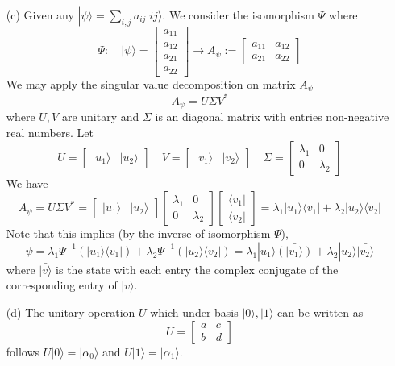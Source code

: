 \begin{enumerate}
\begin{enumerate}
    \item[(c)] Given any $|\psi\rangle = \sum_{i,j} a_{ij} |ij\rangle$. We consider the isomorphism $\Psi$ where
    \[
    \Psi : \quad |\psi\rangle = \begin{bmatrix}
        a_{11} \\ a_{12} \\ a_{21} \\ a_{22}
    \end{bmatrix} \longrightarrow A_{\psi} := \begin{bmatrix}
        a_{11} & a_{12} \\ a_{21} & a_{22}
    \end{bmatrix}
    \]
    We may apply the singular value decomposition on matrix $A_{\psi}$
    \[
    A_{\psi} = U \Sigma V^*
    \]
    where $U, V$ are unitary and $\Sigma$ is an diagonal matrix with entries non-negative real numbers. Let
    \[
    U = \begin{bmatrix}
        |u_1\rangle & |u_2\rangle
    \end{bmatrix} \quad
    V = \begin{bmatrix}
        |v_1\rangle & |v_2\rangle
    \end{bmatrix} \quad
    \Sigma = \begin{bmatrix}
        \lambda_1 & 0 \\ 0 & \lambda_2
    \end{bmatrix}
    \]
    We have
    \[
    A_{\psi} = U \Sigma V^* = \begin{bmatrix}
        |u_1\rangle & |u_2\rangle
    \end{bmatrix} \begin{bmatrix}
        \lambda_1 & 0 \\ 0 & \lambda_2
    \end{bmatrix} \begin{bmatrix}
        \langle v_1| \\ \langle v_2|
    \end{bmatrix} = \lambda_1 |u_1 \rangle \langle v_1 | + \lambda_2 |u_2 \rangle \langle v_2 |
    \]
    Note that this implies (by the inverse of isomorphism $\Psi$),
    \[
    \psi = \lambda_1 \Psi^{-1}(|u_1 \rangle \langle v_1 |) + \lambda_2 \Psi^{-1}(|u_2 \rangle \langle v_2 |) = \lambda_1 |u_1\rangle \bar{(|v_1 \rangle)} + \lambda_2 |u_2\rangle \bar{|v_2 \rangle}
    \]
    where $\bar{|v\rangle}$ is the state with each entry the complex conjugate of the corresponding entry of $|v\rangle$.

    \item[(d)] The unitary operation $U$ which under basis $|0\rangle, |1\rangle$ can be written as
    \[
    U = \begin{bmatrix}
        a & c \\ b & d
    \end{bmatrix}
    \]
    follows $U |0\rangle = |\alpha_0\rangle$ and $U |1\rangle = |\alpha_1\rangle$.
    

\end{enumerate}
\end{enumerate}
